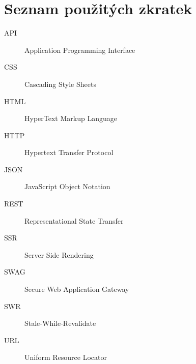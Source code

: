 \chapter{Seznam použitých zkratek}
\begin{description}
	\item[API] Application Programming Interface
	\item[CSS] Cascading Style Sheets   
	\item[HTML] HyperText Markup Language
	\item[HTTP] Hypertext Transfer Protocol 
	\item[JSON] JavaScript Object Notation
	\item[REST] Representational State Transfer 
	\item[SSR] Server Side Rendering
	\item[SWAG] Secure Web Application Gateway 
	\item[SWR] Stale-While-Revalidate
	\item[URL] Uniform Resource Locator 
\end{description}